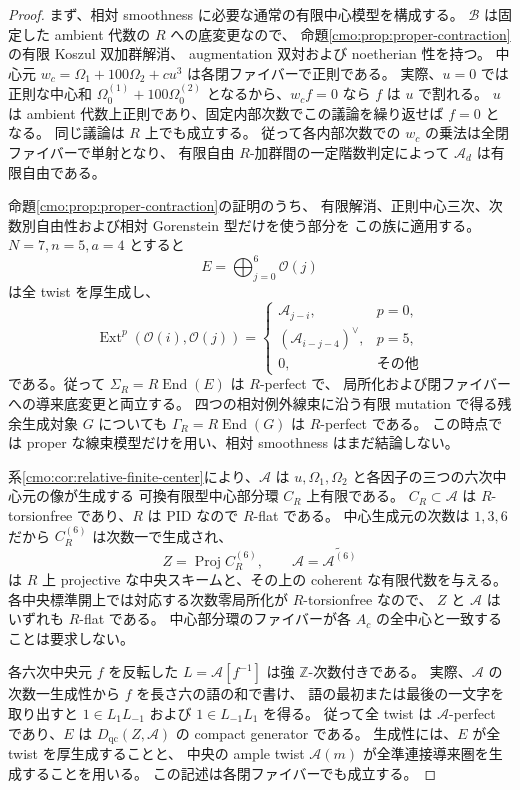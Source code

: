\begin{proof}
まず、相対 smoothness に必要な通常の有限中心模型を構成する。
$\mathscr B$ は固定した ambient 代数の $R$ への底変更なので、
命題\ref{cmo:prop:proper-contraction}の有限 Koszul 双加群解消、
augmentation 双対および noetherian 性を持つ。
中心元 $w_c=\Omega_1+100\Omega_2+cu^3$ は各閉ファイバーで正則である。
実際、$u=0$ では正則な中心和 $\Omega_0^{(1)}+100\Omega_0^{(2)}$
となるから、$w_cf=0$ なら $f$ は $u$ で割れる。
$u$ は ambient 代数上正則であり、固定内部次数でこの議論を繰り返せば $f=0$ となる。
同じ議論は $R$ 上でも成立する。
従って各内部次数での $w_c$ の乗法は全閉ファイバーで単射となり、
有限自由 $R$-加群間の一定階数判定によって
$\mathscr A_d$ は有限自由である。

命題\ref{cmo:prop:proper-contraction}の証明のうち、
有限解消、正則中心三次、次数別自由性および相対 Gorenstein 型だけを使う部分を
この族に適用する。$N=7,n=5,a=4$ とすると
\[
 E=\bigoplus_{j=0}^{6}\mathcal O(j)
\]
は全 twist を厚生成し、
\[
 \operatorname{Ext}^p(\mathcal O(i),\mathcal O(j))
 =
 \begin{cases}
  \mathscr A_{j-i},&p=0,\\
  (\mathscr A_{i-j-4})^\vee,&p=5,\\
  0,&\text{その他}
 \end{cases}
\]
である。従って $\Sigma_R=R\operatorname{End}(E)$ は $R$-perfect で、
局所化および閉ファイバーへの導来底変更と両立する。
四つの相対例外線束に沿う有限 mutation で得る残余生成対象 $G$
についても $\Gamma_R=R\operatorname{End}(G)$ は $R$-perfect である。
この時点では proper な線束模型だけを用い、相対 smoothness はまだ結論しない。

系\ref{cmo:cor:relative-finite-center}により、$\mathscr A$ は
$u,\Omega_1,\Omega_2$ と各因子の三つの六次中心元の像が生成する
可換有限型中心部分環 $C_R$ 上有限である。
$C_R\subset\mathscr A$ は $R$-torsionfree であり、$R$ は PID なので $R$-flat である。
中心生成元の次数は $1,3,6$ だから $C_R^{(6)}$ は次数一で生成され、
\[
 Z=\operatorname{Proj}C_R^{(6)},\qquad
 \mathcal A=\widetilde{\mathscr A^{(6)}}
\]
は $R$ 上 projective な中央スキームと、その上の coherent な有限代数を与える。
各中央標準開上では対応する次数零局所化が $R$-torsionfree なので、
$Z$ と $\mathcal A$ はいずれも $R$-flat である。
中心部分環のファイバーが各 $A_c$ の全中心と一致することは要求しない。

各六次中央元 $f$ を反転した $L=\mathscr A[f^{-1}]$ は強 $\mathbb Z$-次数付きである。
実際、$\mathscr A$ の次数一生成性から $f$ を長さ六の語の和で書け、
語の最初または最後の一文字を取り出すと
$1\in L_1L_{-1}$ および $1\in L_{-1}L_1$ を得る。
従って全 twist は $\mathcal A$-perfect であり、$E$ は
$D_{\mathrm{qc}}(Z,\mathcal A)$ の compact generator である。
生成性には、$E$ が全 twist を厚生成することと、
中央の ample twist $\mathcal A(m)$ が全準連接導来圏を生成することを用いる。
この記述は各閉ファイバーでも成立する。


\end{proof}

